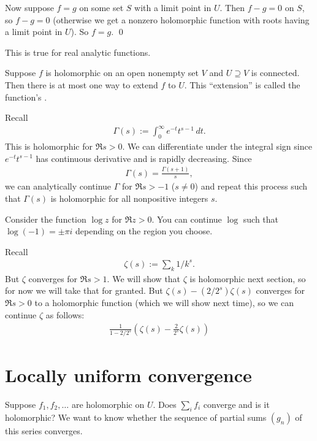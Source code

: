\documentclass[11pt, oneside,margin=1in]{article}
\begin{document}
Now suppose $f=g$ on some set $S$ with a limit point in $U$. Then $f-g=0$ on $S$, so $f-g=0$ (otherwise we get a nonzero holomorphic function with roots having a limit point in $U$). So $f=g$. \hfill \qed

This is true for real analytic functions. 

Suppose $f$ is holomorphic on an open nonempty set $V$ and $U\supseteq V$ is connected. Then there is at most one way to extend $f$ to $U$. This ``extension'' is called the function's  .

\begin{example}\label{}\text{}
Recall 
\begin{align*}
	\Gamma(s) :=  \int_{0}^{\infty} e^{-t}t^{s-1}  \, dt. 
\end{align*}
This is holomorphic for $\Re s > 0$. We can differentiate under the integral sign since $e^{-t}t^{s-1}$ has continuous derivative and is rapidly decreasing. Since 
\begin{align*}
	\Gamma (s) =  \frac{\Gamma(s+1)}{s},
\end{align*}
we can analytically continue $\Gamma$ for $\Re s>-1$ ($s\ne 0$) and repeat this process such that $\Gamma(s)$ is holomorphic for all nonpositive integers $s$.
\end{example}

\begin{example}[ ]\label{}\text{}
Consider the function $\log z$ for $\Re z > 0$. You can continue $\log$ such that $\log(-1) = \pm \pi i$ depending on the region you choose. 
\end{example}

\begin{example}\label{}\text{}
Recall 
\begin{align*}
	\zeta(s) :=  \sum_{k}^{} 1/k^s.
\end{align*}
But $\zeta$ converges for $\Re s > 1$. We will show that $\zeta$ is holomorphic next section, so for now we will take that for granted. But $\zeta(s)-  ({2}/{2^s})\zeta(s)$ converges for $\Re s > 0$ to a holomorphic function (which we will show next time), so we can continue $\zeta$ as follows:
 \begin{align*}
	\frac{1}{1-2/2^s}\left(\zeta(s)- \frac{2}{2^s}\zeta(s)\right)
\end{align*}
\end{example}

\section{Locally uniform convergence}
Suppose $f_1,f_2,\hdots$ are holomorphic on $U$. Does $\sum_{i}^{} f_i$ converge and is it holomorphic? We want to know whether the sequence of partial sums $(g_n)$ of this series converges.
\end{document}
